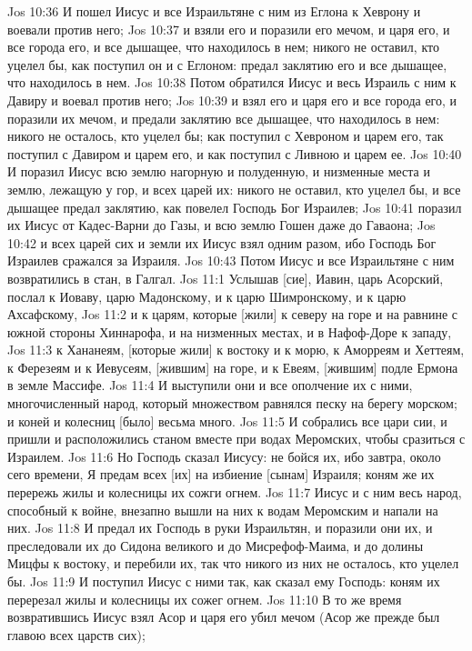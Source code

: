 Jos 10:36  И пошел Иисус и все Израильтяне с ним из Еглона к Хеврону и воевали против него;
Jos 10:37  и взяли его и поразили его мечом, и царя его, и все города его, и все дышащее, что находилось в нем; никого не оставил, кто уцелел бы, как поступил он и с Еглоном: предал заклятию его и все дышащее, что находилось в нем.
Jos 10:38  Потом обратился Иисус и весь Израиль с ним к Давиру и воевал против него;
Jos 10:39  и взял его и царя его и все города его, и поразили их мечом, и предали заклятию все дышащее, что находилось в нем: никого не осталось, кто уцелел бы; как поступил с Хевроном и царем его, так поступил с Давиром и царем его, и как поступил с Ливною и царем ее.
Jos 10:40  И поразил Иисус всю землю нагорную и полуденную, и низменные места и землю, лежащую у гор, и всех царей их: никого не оставил, кто уцелел бы, и все дышащее предал заклятию, как повелел Господь Бог Израилев;
Jos 10:41  поразил их Иисус от Кадес-Варни до Газы, и всю землю Гошен даже до Гаваона;
Jos 10:42  и всех царей сих и земли их Иисус взял одним разом, ибо Господь Бог Израилев сражался за Израиля.
Jos 10:43  Потом Иисус и все Израильтяне с ним возвратились в стан, в Галгал.
Jos 11:1  Услышав [сие], Иавин, царь Асорский, послал к Иоваву, царю Мадонскому, и к царю Шимронскому, и к царю Ахсафскому,
Jos 11:2  и к царям, которые [жили] к северу на горе и на равнине с южной стороны Хиннарофа, и на низменных местах, и в Нафоф-Доре к западу,
Jos 11:3  к Хананеям, [которые жили] к востоку и к морю, к Аморреям и Хеттеям, к Ферезеям и к Иевусеям, [жившим] на горе, и к Евеям, [жившим] подле Ермона в земле Массифе.
Jos 11:4  И выступили они и все ополчение их с ними, многочисленный народ, который множеством равнялся песку на берегу морском; и коней и колесниц [было] весьма много.
Jos 11:5  И собрались все цари сии, и пришли и расположились станом вместе при водах Меромских, чтобы сразиться с Израилем.
Jos 11:6  Но Господь сказал Иисусу: не бойся их, ибо завтра, около сего времени, Я предам всех [их] на избиение [сынам] Израиля; коням же их перережь жилы и колесницы их сожги огнем.
Jos 11:7  Иисус и с ним весь народ, способный к войне, внезапно вышли на них к водам Меромским и напали на них.
Jos 11:8  И предал их Господь в руки Израильтян, и поразили они их, и преследовали их до Сидона великого и до Мисрефоф-Маима, и до долины Мицфы к востоку, и перебили их, так что никого из них не осталось, кто уцелел бы.
Jos 11:9  И поступил Иисус с ними так, как сказал ему Господь: коням их перерезал жилы и колесницы их сожег огнем.
Jos 11:10  В то же время возвратившись Иисус взял Асор и царя его убил мечом (Асор же прежде был главою всех царств сих);
